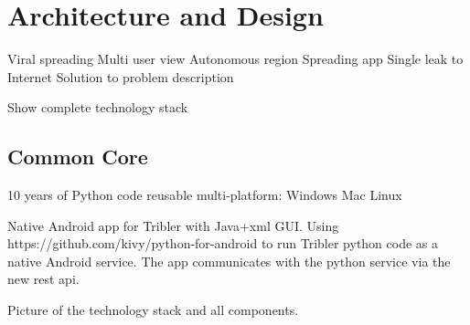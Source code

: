 \chapter{Architecture and Design}

Viral spreading
Multi user view
Autonomous region
Spreading app
Single leak to Internet
Solution to problem description


Show complete technology stack


\section{Common Core}
10 years of Python code 
reusable multi-platform: Windows Mac Linux


Native Android app for Tribler with Java+xml GUI.
Using https://github.com/kivy/python-for-android to run Tribler python code as a native Android service.
The app communicates with the python service via the new rest api.

Picture of the technology stack and all components.

